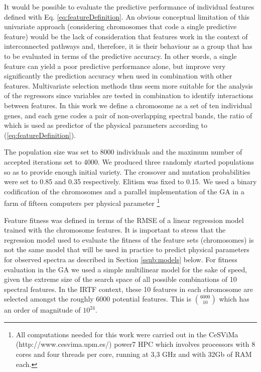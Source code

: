 It would be possible to evaluate the predictive performance of
individual features defined with Eq. \ref{eq:featureDefinition}. An obvious
conceptual limitation of this univariate approach (considering
chromosomes that code a single predictive feature) would be the lack
of consideration that features work in the context of interconnected
pathways and, therefore, it is their behaviour as a group that has to
be evaluated in terms of the predictive accuracy. In other words, a
single feature can yield a poor predictive performance alone, but
improve very significantly the prediction accuracy when used in
combination with other features. Multivariate selection methods thus
seem more suitable for the analysis of the regressors since variables
are tested in combination to identify interactions between
features. In this work we define a chromosome as a set of ten
individual genes, and each gene codes a pair of non-overlapping
spectral bands, the ratio of which is used as predictor of the
physical parameters according to (\ref{eq:featureDefinition}).

The population size was set to 8000 individuals and the maximum number
of accepted iterations set to 4000. We produced three randomly started
populations so as to provide enough initial variety. The crossover and
mutation probabilities were set to 0.85 and 0.35 respectively. Elitism
was fixed to 0.15. We used a binary codification of the chromosomes
and a parallel implementation of the GA in a farm of fifteen computers
per physical parameter \footnote{All computations needed for this work
were carried out in the CeSViMa (http://www.cesvima.upm.es/) power7
HPC which involves processors with 8 cores and four threads per core,
running at 3,3 GHz and with 32Gb of RAM each.}

Feature fitness was defined in terms of the RMSE of a linear
regression model trained with the chromosome features. It is important
to stress that the regression model used to evaluate the fitness of
the feature sets (chromosomes) is not the same model that will be used
in practice to predict physical parameters for observed spectra as
described in Section \ref{ssub:models} below. For fitness evaluation
in the GA we used a simple multilinear model for the sake of speed,
given the extreme size of the search space of all possible
combinations of 10 spectral features. In the IRTF context, these 10
features in each chromosome are selected amongst the roughly 6000
potential features. This is $\binom{6000}{10}$ which has an order of
magnitude of $10^{24}$.

